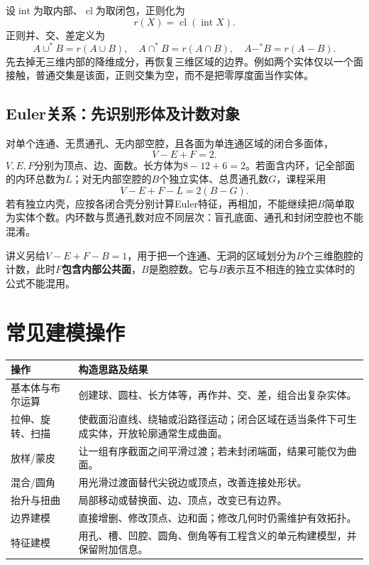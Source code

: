 设$\operatorname{int}$为取内部、$\operatorname{cl}$为取闭包，正则化为
\[
r(X)=\operatorname{cl}(\operatorname{int}X).
\]
正则并、交、差定义为
\[
A\cup^{*}B=r(A\cup B),\quad
A\cap^{*}B=r(A\cap B),\quad
A-^{*}B=r(A-B).
\]
先去掉无三维内部的降维成分，再恢复三维区域的边界。例如两个实体仅以一个面接触，普通交集是该面，正则交集为空，而不是把零厚度面当作实体。

\subsection{Euler关系：先识别形体及计数对象}
对单个连通、无贯通孔、无内部空腔，且各面为单连通区域的闭合多面体，
\[
V-E+F=2.
\]
$V,E,F$分别为顶点、边、面数。长方体为$8-12+6=2$。若面含内环，记全部面的内环总数为$L$；对无内部空腔的$B$个独立实体、总贯通孔数$G$，课程采用
\[
V-E+F-L=2(B-G).
\]
若有独立内壳，应按各闭合壳分别计算Euler特征，再相加，不能继续把$B$简单取为实体个数。内环数与贯通孔数对应不同层次：盲孔底面、通孔和封闭空腔也不能混淆。

讲义另给$V-E+F-B=1$，用于把一个连通、无洞的区域划分为$B$个三维胞腔的计数，此时$F$\textbf{包含内部公共面}，$B$是胞腔数。它与$B$表示互不相连的独立实体时的公式不能混用。


\section{常见建模操作}
\begin{center}
\renewcommand{\arraystretch}{1.3}
\begin{tabularx}{\linewidth}{lX}
\toprule
操作 & 构造思路及结果 \\
\midrule
基本体与布尔运算 & 创建球、圆柱、长方体等，再作并、交、差，组合出复杂实体。 \\
拉伸、旋转、扫描 & 使截面沿直线、绕轴或沿路径运动；闭合区域在适当条件下可生成实体，开放轮廓通常生成曲面。 \\
放样/蒙皮 & 让一组有序截面之间平滑过渡；若未封闭端面，结果可能仅为曲面。 \\
混合/圆角 & 用光滑过渡面替代尖锐边或顶点，改善连接处形状。 \\
抬升与扭曲 & 局部移动或替换面、边、顶点，改变已有边界。 \\
边界建模 & 直接增删、修改顶点、边和面；修改几何时仍需维护有效拓扑。 \\
特征建模 & 用孔、槽、凹腔、圆角、倒角等有工程含义的单元构建模型，并保留附加信息。 \\
\bottomrule
\end{tabularx}
\end{center}

